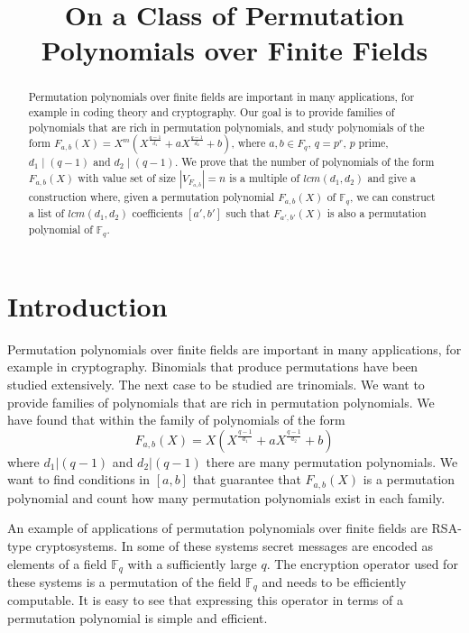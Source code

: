 \documentclass{article}
\theoremstyle{definition}
\theoremstyle{remark}
\numberwithin{equation}{section}
\begin{document}
\title{On a Class of Permutation Polynomials over Finite Fields}


\maketitle

\begin{abstract}
Permutation polynomials over finite fields are important in many applications, for example in coding theory and cryptography. Our goal is to provide families of polynomials that are rich in permutation polynomials, and study polynomials of the form $F_{a,b}(X) =X^m\left(X^{\frac{q-1}{d_1}} + a X^{\frac{q-1}{d_2}} + b \right)$, where $a,b \in F_{q}$, $q=p^r$, $p$ prime, $d_1 \mid (q-1)$ and $d_2 \mid (q-1)$. We prove that the number of polynomials of the form $F_{a,b}(X)$ with value set of size $\left\vert V_{F_{a,b}} \right\vert =n$ is a multiple of $lcm(d_1,d_2)$ and give a construction where, given a permutation polynomial $F_{a,b}(X)$ of $\mathbb{F}_q$, we can construct a list of $lcm(d_1,d_2)$ coefficients $[a',b']$ such that $F_{a',b'}(X)$ is also a permutation polynomial of $\mathbb{F}_q$.
\end{abstract}


\section{Introduction}

Permutation polynomials over finite fields are important in many applications, for example in cryptography. Binomials that produce permutations have been studied extensively. The next case to be studied are trinomials. We want to provide families of polynomials that are rich in permutation polynomials. We have found that within the family of polynomials of the form $$F_{a,b}(X) = X(X^{\frac{q-1}{d_1}} + aX^{\frac{q-1}{d_2}} +b)$$ where $d_1 | (q-1)$ and $d_2 | (q-1)$  there are many permutation polynomials. We want to find conditions in $[a,b]$ that guarantee that $F_{a,b}(X)$ is a permutation polynomial and count how many permutation polynomials exist in each family.

An example of applications of permutation polynomials over finite fields are RSA-type cryptosystems. In some of these systems secret messages are encoded as elements of a field $\mathbb{F}_{q}$ with a sufficiently large $q$. The encryption operator used for these systems is a permutation of the field $\mathbb{F}_{q}$ and needs to be efficiently computable. It is easy to see that expressing this operator in terms of a permutation polynomial is simple and efficient.
\end{document}
